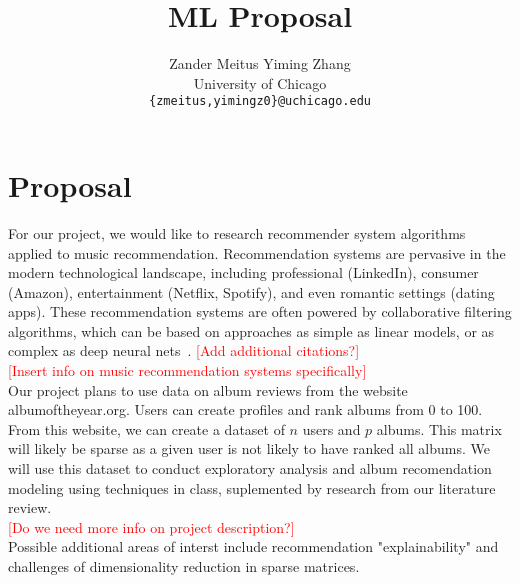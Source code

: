 \documentclass{article}
\title{ML Proposal}
\author{
  Zander Meitus \qquad Yiming Zhang \\
  University of Chicago \\
  \texttt{\{zmeitus,yimingz0\}@uchicago.edu}
}
\begin{document}
\maketitle

\section{Proposal}


For our project, we would like to research recommender system algorithms applied 
to music recommendation. Recommendation systems are pervasive in the modern 
technological landscape, including professional (LinkedIn), consumer (Amazon), 
entertainment (Netflix, Spotify), and even romantic settings (dating apps). These
recommendation systems are often powered by collaborative filtering algorithms, 
which can be based on approaches as simple as linear models, or as complex as 
deep neural nets~\citep{Anelli_2022}. 
\textcolor{red}{[Add additional citations?]} \\
\textcolor{red}{[Insert info on music recommendation systems specifically]} \\

Our project plans to use data on album reviews from the website albumoftheyear.org.
Users can create profiles and rank albums from 0 to 100. From this website, we
can create a dataset of $n$ users and $p$ albums. This matrix will likely be
sparse as a given user is not likely to have ranked all albums. We will use this 
dataset to conduct exploratory analysis and album recomendation modeling using
techniques in class, suplemented by research from our literature review.\\
\textcolor{red}{[Do we need more info on project description?]} \\

Possible additional areas of interst include recommendation "explainability" and 
challenges of dimensionality reduction in sparse matrices.~\citep{Afchar_2022}~\citep{Ling_2021}



\end{document}
